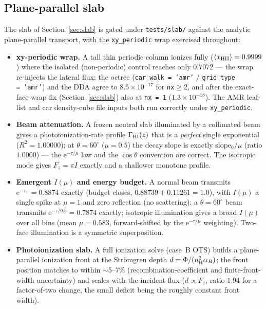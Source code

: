 \documentclass[english,a4paper]{my_memo}
\newcommand{\code}[1]{\texttt{#1}}
\begin{document}
\subsection{Plane-parallel slab}
\label{sec:slabval}
The slab of Section~\ref{sec:slab} is gated under \code{tests/slab/} against
the analytic plane-parallel transport, with the \code{xy\_periodic} wrap
exercised throughout:
\begin{itemize}\itemsep2pt
\item \textbf{xy-periodic wrap.}  A tall thin periodic column ionizes fully
  ($\langle x_{\rm HII}\rangle = 0.9999$) where the isolated (non-periodic)
  control reaches only $0.7072$ --- the wrap re-injects the lateral flux; the
  octree (\code{car\_walk\,=\,'amr'} / \code{grid\_type\,=\,'amr'}) and the
  DDA agree to $8.5{\times}10^{-17}$ for \code{nx}$\ge$2, and after the
  exact-face wrap fix (Section~\ref{sec:slab}) also at \code{nx\,=\,1}
  ($1.3{\times}10^{-18}$).  The AMR leaf-list and car density-cube file inputs
  both run correctly under \code{xy\_periodic}.
\item \textbf{Beam attenuation.}  A frozen neutral slab illuminated by a
  collimated beam gives a photoionization-rate profile $\Gamma_{\rm HI}(z)$
  that is a \emph{perfect} single exponential ($R^2 = 1.00000$); at
  $\theta = 60^{\circ}$ ($\mu = 0.5$) the decay slope is exactly
  slope$_0/\mu$ (ratio $1.0000$) --- the $\mathrm{e}^{-\tau/\mu}$ law and the
  $\cos\theta$ convention are correct.  The isotropic mode gives $F_z = \pi I$
  exactly and a shallower monotone profile.
\item \textbf{Emergent $I(\mu)$ and energy budget.}  A normal beam transmits
  $\mathrm{e}^{-\tau_\perp} = 0.8874$ exactly (budget closes,
  $0.88739 + 0.11261 = 1.0$), with $I(\mu)$ a single spike at $\mu = 1$ and
  zero reflection (no scattering); a $\theta = 60^{\circ}$ beam transmits
  $\mathrm{e}^{-\tau/0.5} = 0.7874$ exactly; isotropic illumination gives a
  broad $I(\mu)$ over all bins (mean $\mu = 0.583$, forward-shifted by the
  $\mathrm{e}^{-\tau/\mu}$ weighting).  Two-face illumination is a symmetric
  superposition.
\item \textbf{Photoionization slab.}  A full ionization solve (case~B OTS)
  builds a plane-parallel ionization front at the Str\"omgren depth
  $d = \Phi/(n_{\rm H}^2\alpha_B)$; the front position matches to within
  $\sim$5--7\% (recombination-coefficient and finite-front-width uncertainty)
  and scales with the incident flux ($d \propto F_z$, ratio $1.94$ for a
  factor-of-two change, the small deficit being the roughly constant front
  width).
\end{itemize}
\end{document}
